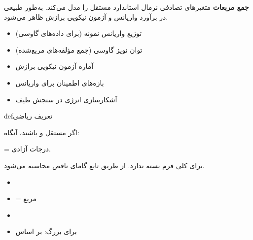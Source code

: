 

\textbf{جمع مربعات} متغیرهای تصادفی نرمال استاندارد مستقل را مدل می‌کند. به‌طور طبیعی در برآورد واریانس و آزمون نیکویی برازش ظاهر می‌شود.


\begin{itemize}
\tightlist
\item
  توزیع واریانس نمونه (برای داده‌های گاوسی)
\item
  توان نویز گاوسی (جمع مؤلفه‌های مربع‌شده)
\item
  آماره آزمون نیکویی برازش
\item
  بازه‌های اطمینان برای واریانس
\item
  آشکارسازی انرژی در سنجش طیف
\end{itemize}

\begin{PSbox}[unbreakable]{def}{تعریف ریاضی}

اگر  مستقل و  باشند، آنگاه:

 = درجات آزادی.

\end{PSbox}




برای  کلی فرم بسته ندارد. از طریق تابع گامای ناقص محاسبه می‌شود.






\begin{itemize}
\tightlist
\item
\item
   = مربع 
\item
\item
  برای  بزرگ:  بر اساس 
\end{itemize}

